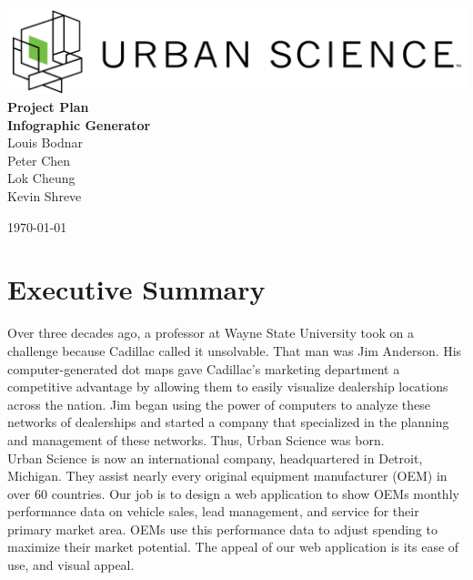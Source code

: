 \documentclass[11pt,a4paper,oneside]{article}
\begin{document}
\begin{titlepage}



\begin{center}

\includegraphics[width=1\textwidth]{images/sponsor-logo.png}\\[1cm]    

{ \huge \bfseries Project Plan}\\[0.4cm]
{ \large \bfseries Infographic Generator}\\[0.4cm]

Louis Bodnar\\
Peter Chen\\
Lok Cheung\\
Kevin Shreve\\



\vfill

{\large \today}

\end{center}

\end{titlepage}

\tableofcontents

\newpage

\listoffigures

\newpage

\section{Executive Summary}


Over three decades ago, a professor at Wayne State University took on a challenge because Cadillac called it unsolvable.  That man was Jim Anderson.  His computer-generated dot maps gave Cadillac's marketing department a competitive advantage by allowing them to easily visualize dealership locations across the nation.  Jim began using the power of computers to analyze these networks of dealerships and started a company that specialized in the planning and management of these networks.  Thus, Urban Science was born.\\


Urban Science is now an international company, headquartered in Detroit, Michigan.  They assist nearly every original equipment manufacturer (OEM) in over 60 countries.  Our job is to design a web application to show OEMs monthly performance data on vehicle sales, lead management, and service for their primary market area.  OEMs use this performance data to adjust spending to maximize their market potential.  The appeal of our web application is its ease of use, and visual appeal.\\
\end{document}

